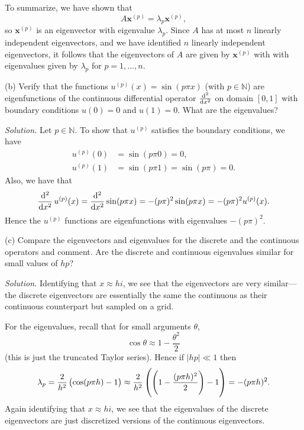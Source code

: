 \documentclass{article}
\def\*#1{\mathbf{#1}}
\newcommand{\N}{\mathbb{N}}
\begin{document}
%
To summarize, we have shown that
%
\begin{equation*}
    A \*x^{(p)} = \lambda_p \*x^{(p)}
    ,
\end{equation*}
%
so $\*x^{(p)}$ is an eigenvector with eigenvalue $\lambda_p$.
Since $A$ has at most $n$ linearly independent eigenvectors,
and we have identified $n$ linearly independent eigenvectors,
it follows that the eigenvectors of $A$ are given by $\*x^{(p)}$ with
with eigenvalues given by $\lambda_p$ for $p = 1, \ldots, n$.

\vspace{5mm}

(b) Verify that the functions $u^{(p)}(x) = \sin(p \pi x)$ (with
$p \in \N$) are eigenfunctions of the continuous differential operator
$\od[2]{}{x}$ on domain $[0, 1]$ with boundary conditions
$u(0) = 0$ and $u(1) = 0$. What are the eigenvalues?

\textit{Solution.}
Let $p \in \N$. To show that $u^{(p)}$ satisfies the boundary conditions,
we have
%
\begin{align*}
    u^{(p)}(0) &= \sin(p \pi 0) = 0, \\
    u^{(p)}(1) &= \sin(p \pi 1) = \sin(p \pi) = 0
    .
\end{align*}
%
Also, we have that
%
\begin{equation*}
    \dod[2]{}{x} u^{(p)}(x) = \dod[2]{}{x} \sin(p \pi x) = -(p \pi)^2 \sin(p \pi x) = -(p \pi)^2 u^{(p)}(x)
    .
\end{equation*}
%
Hence the $u^{(p)}$ functions are eigenfunctions with eigenvalues $-(p \pi)^2$.

\vspace{5mm}

(c) Compare the eigenvectors and eigenvalues for the discrete and the
continuous operators and comment. Are the discrete and continuous eigenvalues
similar for small values of $hp$?

\textit{Solution.}
Identifying that $x \approx h i$, we see that the eigenvectors are very
similar---the discrete eigenvectors are essentially the same the continuous
as their continuous counterpart but sampled on a grid.

For the eigenvalues, recall that for small arguments $\theta$,
%
\begin{equation*}
    \cos \theta \approx 1 - \frac{\theta^2}{2}
\end{equation*}
%
(this is just the truncated Taylor series). Hence if $|h p| \ll 1$
then
%
\begin{equation*}
    \lambda_p
        = \frac{2}{h^2} \del{\cos(p \pi h) - 1}
        \approx \frac{2}{h^2} \del{\del{1 - \frac{(p \pi h)^2}{2}} - 1}
        = - (p \pi h)^2
        .
\end{equation*}
%
Again identifying that $x \approx hi$, we see that the eigenvalues
of the discrete eigenvectors are just discretized versions of the
continuous eigenvectors.
\end{document}
